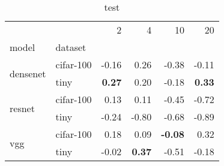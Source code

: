 \begin{table}
\caption{test}
\begin{tabular}{llrrrr}
\toprule
 &  & 2 & 4 & 10 & 20 \\
model & dataset &  &  &  &  \\
\midrule
\multirow[c]{2}{*}{densenet} & cifar-100 & -0.16 & 0.26 & -0.38 & -0.11 \\
 & tiny & \color{green} \bfseries 0.27 & 0.20 & -0.18 & \color{green} \bfseries 0.33 \\
\multirow[c]{2}{*}{resnet} & cifar-100 & 0.13 & 0.11 & -0.45 & -0.72 \\
 & tiny & -0.24 & -0.80 & -0.68 & -0.89 \\
\multirow[c]{2}{*}{vgg} & cifar-100 & 0.18 & 0.09 & \color{green} \bfseries -0.08 & 0.32 \\
 & tiny & -0.02 & \color{green} \bfseries 0.37 & -0.51 & -0.18 \\
\bottomrule
\end{tabular}
\end{table}
